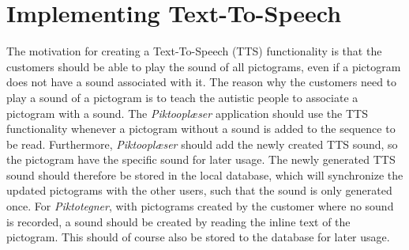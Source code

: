 \section{Implementing Text-To-Speech}
The motivation for creating a Text-To-Speech (TTS) functionality is that the customers should be able to play the sound of all pictograms, even if a pictogram does not have a sound associated with it.
The reason why the customers need to play a sound of a pictogram is to teach the autistic people to associate a pictogram with a sound.
The \textit{Piktooplæser} application should use the TTS functionality whenever a pictogram without a sound is added to the sequence to be read.
Furthermore, \textit{Piktooplæser} should add the newly created TTS sound, so the pictogram have the specific sound for later usage. The newly generated TTS sound should therefore be stored in the local database, which will synchronize the updated pictograms with the other users, such that the sound is only generated once.
For \textit{Piktotegner}, with pictograms created by the customer where no sound is recorded, a sound should be created by reading the inline text of the pictogram. This should of course also be stored to the database for later usage.